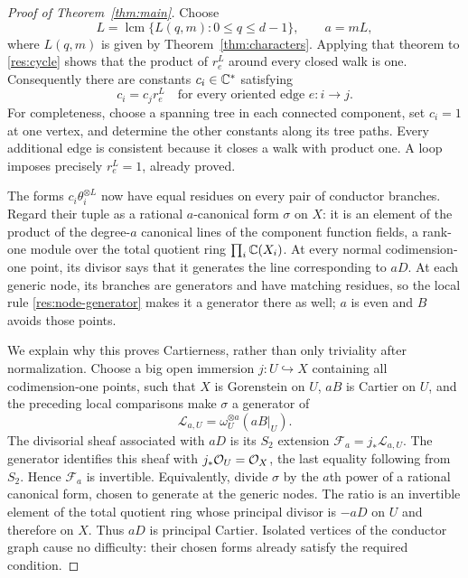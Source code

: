 \begin{proof}[Proof of Theorem~\ref{thm:main}]
 Choose
 \begin{equation}\label{res:uniform-exponent}
  L=\operatorname{lcm}\{L(q,m):0\le q\le d-1\},
  \qquad a=mL,
 \end{equation}
 where $L(q,m)$ is given by Theorem~\ref{thm:characters}.
 Applying that theorem to \eqref{res:cycle} shows that the product
 of $r_e^L$ around every closed walk is one.  Consequently there
 are constants $c_i\in\mathbb C^*$ satisfying
 \begin{equation}\label{res:scales}
  c_i=c_jr_e^L\quad\text{for every oriented edge }e:i\to j.
 \end{equation}
 For completeness, choose a spanning tree in each connected
 component, set $c_i=1$ at one vertex, and determine the other
 constants along its tree paths.  Every additional edge is
 consistent because it closes a walk with product one.  A loop
 imposes precisely $r_e^L=1$, already proved.

 The forms $c_i\theta_i^{\otimes L}$ now have equal residues on
 every pair of conductor branches.  Regard their tuple as a
 rational $a$-canonical form $\sigma$ on $X$: it is an element
 of the product of the degree-$a$ canonical lines of the component
 function fields, a rank-one module over the total quotient ring
 $\prod_i\mathbb C(X_i)$.  At every normal
 codimension-one point, its divisor says that it generates the
 line corresponding to $aD$.  At each generic node, its branches
 are generators and have matching residues, so the local rule
 \eqref{res:node-generator} makes it a generator there as well;
 $a$ is even and $B$ avoids those points.

 We explain why this proves Cartierness, rather than only
 triviality after normalization.  Choose a big open immersion
 $j:U\hookrightarrow X$ containing all codimension-one points,
 such that $X$ is Gorenstein on $U$, $aB$ is Cartier on $U$, and
 the preceding local comparisons make $\sigma$ a generator of
 \[
  \mathcal L_{a,U}=\omega_U^{\otimes a}(aB|_U).
 \]
 The divisorial sheaf associated with $aD$ is its $S_2$ extension
 $\mathcal F_a=j_*\mathcal L_{a,U}$.  The generator identifies
 this sheaf with $j_*\mathcal O_U=\mathcal O_X$, the last equality following
 from $S_2$.  Hence $\mathcal F_a$ is invertible.  Equivalently,
 divide $\sigma$ by the $a$th power of a rational canonical
 form, chosen to generate at the generic nodes.  The ratio is
 an invertible element of the total quotient ring whose
 principal divisor is $-aD$ on $U$ and therefore on $X$.
 Thus $aD$ is principal Cartier.  Isolated vertices of the
 conductor graph cause no difficulty: their chosen forms
 already satisfy the required condition.


\end{proof}
